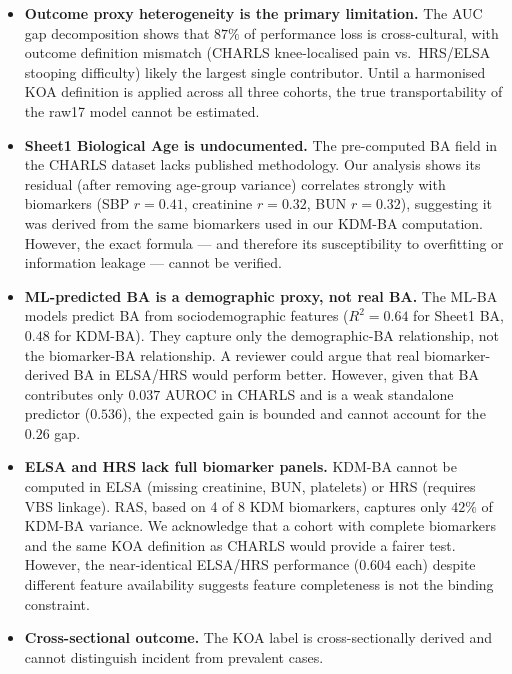 \documentclass[11pt,a4paper]{article}
\begin{document}
\begin{itemize}

\item \textbf{Outcome proxy heterogeneity is the primary limitation.} The AUC gap
      decomposition shows that $87\%$ of performance loss is cross-cultural, with
      outcome definition mismatch (CHARLS knee-localised pain vs.\ HRS/ELSA stooping
      difficulty) likely the largest single contributor. Until a harmonised KOA
      definition is applied across all three cohorts, the true transportability of
      the raw17 model cannot be estimated.

\item \textbf{Sheet1 Biological Age is undocumented.} The pre-computed BA field in
      the CHARLS dataset lacks published methodology. Our analysis shows its residual
      (after removing age-group variance) correlates strongly with biomarkers
      (SBP $r=0.41$, creatinine $r=0.32$, BUN $r=0.32$), suggesting it was derived
      from the same biomarkers used in our KDM-BA computation. However, the exact
      formula --- and therefore its susceptibility to overfitting or information
      leakage --- cannot be verified.

\item \textbf{ML-predicted BA is a demographic proxy, not real BA.} The ML-BA models
      predict BA from sociodemographic features ($R^2=0.64$ for Sheet1 BA, $0.48$
      for KDM-BA). They capture only the demographic-BA relationship, not the
      biomarker-BA relationship. A reviewer could argue that real biomarker-derived
      BA in ELSA/HRS would perform better. However, given that BA contributes only
      $0.037$ AUROC in CHARLS and is a weak standalone predictor ($0.536$), the
      expected gain is bounded and cannot account for the $0.26$ gap.

\item \textbf{ELSA and HRS lack full biomarker panels.} KDM-BA cannot be computed in
      ELSA (missing creatinine, BUN, platelets) or HRS (requires VBS linkage). RAS,
      based on 4 of 8 KDM biomarkers, captures only $42\%$ of KDM-BA variance. We
      acknowledge that a cohort with complete biomarkers and the same KOA definition
      as CHARLS would provide a fairer test. However, the near-identical ELSA/HRS
      performance ($0.604$ each) despite different feature availability suggests
      feature completeness is not the binding constraint.

\item \textbf{Cross-sectional outcome.} The KOA label is cross-sectionally derived
      and cannot distinguish incident from prevalent cases.


\end{itemize}
\end{document}
